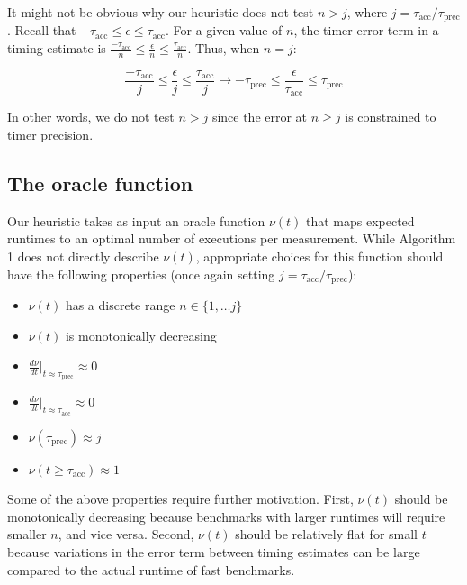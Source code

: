 \documentclass[conference]{IEEEtran}
\begin{document}
It might not be obvious why our heuristic does not test $n > j$, where
$j = \tau_{\textrm{acc}} / \tau_{\textrm{prec}}$. Recall
that $-\tau_{\textrm{acc}} \le \epsilon \le \tau_{\textrm{acc}}$. For a given value of $n$,
the timer error term in a timing estimate is $\frac{-\tau_{\textrm{acc}}}{n} \le
\frac{\epsilon}{n} \le \frac{\tau_{\textrm{acc}}}{n}$. Thus, when $n = j$:

\begin{equation}
\frac{-\tau_{\textrm{acc}}}{j} \le \frac{\epsilon}{j} \le \frac{\tau_{\textrm{acc}}}{j} \to -\tau_{\textrm{prec}} \le \frac{\epsilon}{\tau_{\textrm{acc}}} \le \tau_{\textrm{prec}}
\end{equation}

In other words, we do not test $n > j$ since the error at $n \ge j$ is constrained to timer
precision.

\subsection{The oracle function}
\label{sec:oracle}

Our heuristic takes as input an oracle function $\nu(t)$ that maps expected runtimes to an
optimal number of executions per measurement. While Algorithm 1 does not directly describe
$\nu(t)$, appropriate choices for this function should have the following properties (once
again setting $j = \tau_{\textrm{acc}} / \tau_{\textrm{prec}}$):

\begin{itemize}
    \item $\nu(t)$ has a discrete range $n \in \{1, \dots j\}$
    \item $\nu(t)$ is monotonically decreasing
    \item $\frac{d\nu}{dt}|_{t \approx \tau_{\textrm{prec}}} \approx 0$
    \item $\frac{d\nu}{dt}|_{t \approx \tau_{\textrm{acc}}} \approx 0$
    \item $\nu(\tau_{\textrm{prec}}) \approx j$
    \item $\nu(t \ge \tau_{\textrm{acc}}) \approx 1$
\end{itemize}

Some of the above properties require further motivation. First, $\nu(t)$ should be
monotonically decreasing because benchmarks with larger runtimes will require smaller $n$,
and vice versa. Second, $\nu(t)$ should be relatively flat for small $t$ because variations
in the error term between timing estimates can be large compared to the actual runtime of
fast benchmarks.
\end{document}
